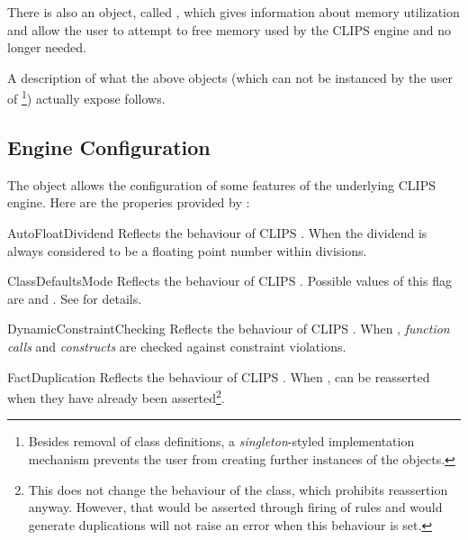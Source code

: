 There is also an object, called , which gives information
about memory utilization and allow the user to attempt to free memory
used by the CLIPS engine and no longer needed.

A description of what the above objects (which can not be instanced by
the user of \pyclips{}\footnote{Besides removal of class definitions, a
\emph{singleton}-styled implementation mechanism prevents the user from
creating further instances of the objects.}) actually expose follows.


\subsection{Engine Configuration\label{pyclips-cl-statusconf-engine}}

The  object allows the configuration of some features
of the underlying CLIPS engine. Here are the properies provided by
:

\begin{memberdesc}[property]{AutoFloatDividend}
Reflects the behaviour of CLIPS . When
 the dividend is always considered to be a floating point
number within divisions.
\end{memberdesc}

\begin{memberdesc}[property]{ClassDefaultsMode}
Reflects the behaviour of CLIPS .
Possible values of this flag are  and
. See \clipsapg{} for details.
\end{memberdesc}

\begin{memberdesc}[property]{DynamicConstraintChecking}
Reflects the behaviour of CLIPS .
When , \emph{function calls} and \emph{constructs} are
checked against constraint violations.
\end{memberdesc}

\begin{memberdesc}[property]{FactDuplication}
Reflects the behaviour of CLIPS . When
,  can be reasserted when they have already
been asserted\footnote{This does not change the behaviour of the
 class, which prohibits reassertion anyway. However,
 that would be asserted through firing of rules and would
generate duplications will not raise an error when this behaviour is
set.}.
\end{memberdesc}

